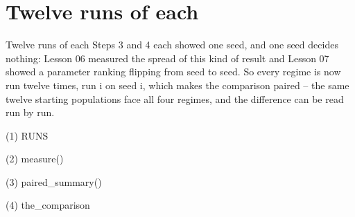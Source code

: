 \section{Twelve runs of each}

\begin{frame}{Twelve runs of each}
Steps 3 and 4 each showed one seed, and one seed decides nothing: Lesson 06
measured the spread of this kind of result and Lesson 07 showed a parameter
ranking flipping from seed to seed. So every regime is now run twelve times,
run i on seed i, which makes the comparison paired -- the same twelve starting
populations face all four regimes, and the difference can be read run by run.
\end{frame}

\begin{frame}[fragile]{(1) RUNS}

\end{frame}

\begin{frame}[fragile]{(2) measure()}

\end{frame}

\begin{frame}[fragile]{(3) paired\_summary()}

\end{frame}

\begin{frame}[fragile]{(4) the\_comparison}

\end{frame}


